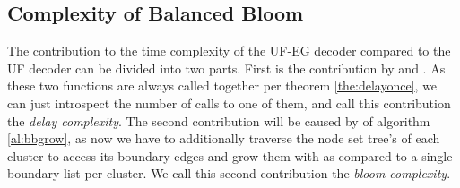 \begin{algo}[algotitle=UFBalancedBloom, label=al:ufbb]
\begin{algorithm}[H]

\KwData{\buckets}

\BlankLine

\end{algorithm}
\end{algo}


\subsection{Complexity of Balanced Bloom}\label{sec:ufbbcomplexity}

The contribution to the time complexity of the UF-EG decoder compared to the UF decoder can be divided into two parts. First is the contribution by  and . As these two functions are always called together per theorem \ref{the:delayonce}, we can just introspect the number of calls to one of them, and call this contribution the \emph{delay complexity}. The second contribution will be caused by  of algorithm \ref{al:bbgrow}, as now we have to additionally traverse the node set tree's of each cluster to access its boundary edges and grow them with  as compared to a single boundary list per cluster. We call this second contribution the \emph{bloom complexity}.

